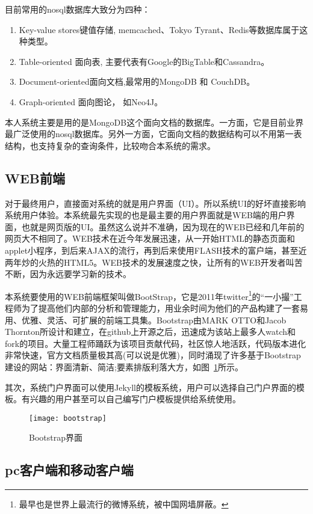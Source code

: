 目前常用的nosql数据库大致分为四种：
\begin{enumerate}
\item Key-value stores键值存储, memcached、Tokyo Tyrant、Redis等数据库属于这种类型。
\item Table-oriented 面向表, 主要代表有Google的BigTable和Cassandra。
\item Document-oriented面向文档,最常用的MongoDB 和 CouchDB。
\item Graph-oriented 面向图论， 如Neo4J。
\end{enumerate}
本人系统主要是用的是MongoDB\cite{banker2011mongodb,chodorow2010mongodb,wei2011using}这个面向文档的数据库。一方面，它是目前业界最广泛使用的nosql数据库。另外一方面，它面向文档的数据结构可以不用第一表结构，也支持复杂的查询条件，比较吻合本系统的需求。

\subsection{WEB前端}
\label{sec:webui}

对于最终用户，直接面对系统的就是用户界面（UI）。所以系统UI的好坏直接影响系统用户体验。本系统最先实现的也是最主要的用户界面就是WEB端的用户界面，也就是网页版的UI。虽然这么说并不准确，因为现在的WEB已经和几年前的网页大不相同了。WEB技术在近今年发展迅速，从一开始HTML的静态页面和applet小程序，到后来AJAX的流行，再到后来使用FLASH技术的富户端，甚至近两年炒的火热的HTML5。WEB技术的发展速度之快，让所有的WEB开发者叫苦不断，因为永远要学习新的技术。

本系统要使用的WEB前端框架叫做BootStrap，它是2011年twitter\footnote{最早也是世界上最流行的微博系统，被中国网墙屏蔽。}的“一小撮”工程师为了提高他们内部的分析和管理能力，用业余时间为他们的产品构建了一套易用、优雅、灵活、可扩展的前端工具集。Bootstrap由MARK OTTO和Jacob Thornton所设计和建立，在github上开源之后，迅速成为该站上最多人watch和fork的项目。大量工程师踊跃为该项目贡献代码，社区惊人地活跃，代码版本进化非常快速，官方文档质量极其高(可以说是优雅)，同时涌现了许多基于Bootstrap建设的网站：界面清新、简洁;要素排版利落大方，如图~\ref{fig:xfig14}所示。

其次，系统门户界面可以使用Jekyll的模板系统，用户可以选择自己门户界面的模板。有兴趣的用户甚至可以自己编写门户模板提供给系统使用。

\begin{figure}[H]
  \centering
  \texttt{[image: bootstrap]}
  \caption{Bootstrap界面}
  \label{fig:xfig14}
\end{figure}

\subsection{pc客户端和移动客户端}
\label{sec:pcandriodmac}

